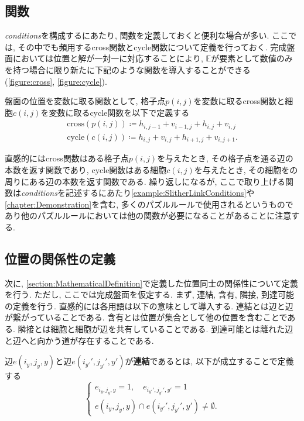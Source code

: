 \subsection{関数}\label{subsection:Function}
\textit{conditions}を構成するにあたり, 関数を定義しておくと便利な場合が多い. ここでは, その中でも頻用するcross関数とcycle関数について定義を行っておく.
完成盤面においては位置と解が一対一に対応することにより, $\mathbb{E}$が要素として数値のみを持つ場合に限り新たに下記のような関数を導入することができる(\cref{figure:cross}, \cref{figure:cycle}).

\begin{definition}\label{definition:Function}
  盤面の位置を変数に取る関数として, 格子点$p(i,j)$を変数に取るcross関数と細胞$c(i,j)$を変数に取るcycle関数を以下で定義する
  \begin{align}
    \text{cross}(p(i,j))\coloneqq h_{i,j-1}+v_{i-1,j}+h_{i,j}+v_{i,j} \\
    \text{cycle}(c(i,j))\coloneqq h_{i,j}+v_{i,j}+h_{i+1,j}+v_{i,j+1}.
  \end{align}
\end{definition}

直感的にはcross関数はある格子点$p(i,j)$を与えたとき, その格子点を通る辺の本数を返す関数であり, cycle関数はある細胞$c(i,j)$を与えたとき, その細胞をの周りにある辺の本数を返す関数である.
繰り返しになるが, ここで取り上げる関数は\textit{conditions}を記述するにあたり\cref{example:SlitherLinkConditions}や\cref{chapter:Demonstration}を含む, 多くのパズルルールで使用されるというものであり他のパズルルールにおいては他の関数が必要になることがあることに注意する.

\subsection{位置の関係性の定義}\label{subsection:RelationDefinition}

次に, \cref{section:MathematicalDefinition}で定義した位置同士の関係性について定義を行う. ただし, ここでは完成盤面を仮定する.
まず, 連結, 含有, 隣接, 到達可能の定義を行う.
直感的には各用語は以下の意味として導入する.
連結とは辺と辺が繋がっていることである.
含有とは位置が集合として他の位置を含むことである.
隣接とは細胞と細胞が辺を共有していることである.
到達可能とは離れた辺と辺へと向かう道が存在することである.

\begin{definition}[連結]\label{definition:Connection}
  辺$e(i_y,j_y,y)$と辺$e(i_{y'}',j_{y'}',y')$が\textbf{連結}であるとは, 以下が成立することで定義する
  \begin{equation}
    \begin{cases}
      {e_{i_y,j_y,y}=1,\quad e_{i_{y'}',j_{y'}',y'}  =     1          } \\
      {e(i_y,j_y,y)\cap e(i_{y'}',j_{y'}',y')  \neq  \emptyset}.
    \end{cases}
  \end{equation}
\end{definition}

